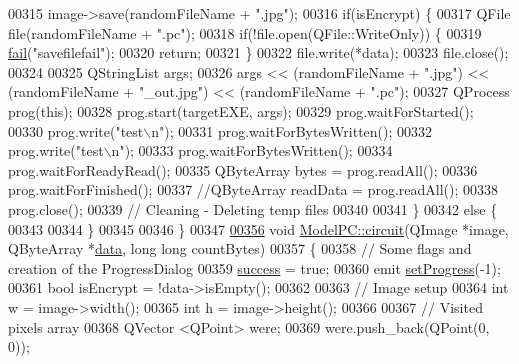 \begin{DoxyCode}
00315     image->save(randomFileName + \textcolor{stringliteral}{".jpg"});
00316     \textcolor{keywordflow}{if}(isEncrypt) \{
00317         QFile file(randomFileName + \textcolor{stringliteral}{".pc"});
00318         \textcolor{keywordflow}{if}(!file.open(QFile::WriteOnly)) \{
00319             \hyperlink{class_model_p_c_a47464b59b7e37fcee25e55475708aabd}{fail}(\textcolor{stringliteral}{"savefilefail"});
00320             \textcolor{keywordflow}{return};
00321         \}
00322         file.write(*data);
00323         file.close();
00324 
00325         QStringList args;
00326         args << (randomFileName + \textcolor{stringliteral}{".jpg"}) << (randomFileName + \textcolor{stringliteral}{"\_out.jpg"}) << (randomFileName + \textcolor{stringliteral}{".pc"});
00327         QProcess prog(\textcolor{keyword}{this});
00328         prog.start(targetEXE, args);
00329         prog.waitForStarted();
00330         prog.write(\textcolor{stringliteral}{"test\(\backslash\)n"});
00331         prog.waitForBytesWritten();
00332         prog.write(\textcolor{stringliteral}{"test\(\backslash\)n"});
00333         prog.waitForBytesWritten();
00334         prog.waitForReadyRead();
00335         QByteArray bytes = prog.readAll();
00336         prog.waitForFinished();
00337         \textcolor{comment}{//QByteArray readData = prog.readAll();}
00338         prog.close();
00339         \textcolor{comment}{// Cleaning - Deleting temp files}
00340 
00341     \}
00342     \textcolor{keywordflow}{else} \{
00343 
00344     \}
00345 
00346 \}
00347 
\hypertarget{modelpc_8cpp_source.tex_l00356}{}\hyperlink{class_model_p_c_a1d0091062a0c836b283ec2f67411623b}{00356} \textcolor{keywordtype}{void} \hyperlink{class_model_p_c_a1d0091062a0c836b283ec2f67411623b}{ModelPC::circuit}(QImage *image, QByteArray *\hyperlink{namespace_errors_dict_setup_af570460846fb9f0c91abd308a095dcdc}{data}, \textcolor{keywordtype}{long} \textcolor{keywordtype}{long} countBytes)
00357 \{
00358     \textcolor{comment}{// Some flags and creation of the ProgressDialog}
00359     \hyperlink{class_model_p_c_a945ffbbc44a832b953c191debd448f4c}{success} = \textcolor{keyword}{true};
00360     emit \hyperlink{class_model_p_c_afdcd80f0ed5062e145a71f09b0897547}{setProgress}(-1);
00361     \textcolor{keywordtype}{bool} isEncrypt = !data->isEmpty();
00362 
00363     \textcolor{comment}{// Image setup}
00364     \textcolor{keywordtype}{int} w = image->width();
00365     \textcolor{keywordtype}{int} h = image->height();
00366 
00367     \textcolor{comment}{// Visited pixels array}
00368     QVector <QPoint> were;
00369     were.push\_back(QPoint(0, 0));

\end{DoxyCode}
